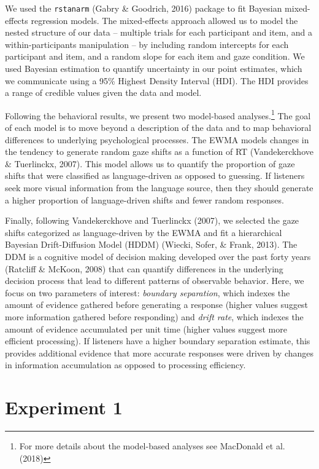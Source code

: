 \documentclass[man,floatsintext]{apa6}
\let\rmarkdownfootnote\footnote%
\def\footnote{\protect\rmarkdownfootnote}
\begin{document}
We used the \texttt{rstanarm} (Gabry \& Goodrich, 2016) package to fit
Bayesian mixed-effects regression models. The mixed-effects approach
allowed us to model the nested structure of our data -- multiple trials
for each participant and item, and a within-participants manipulation --
by including random intercepts for each participant and item, and a
random slope for each item and gaze condition. We used Bayesian
estimation to quantify uncertainty in our point estimates, which we
communicate using a 95\% Highest Density Interval (HDI). The HDI
provides a range of credible values given the data and model.

Following the behavioral results, we present two model-based
analyses.\footnote{For more details about the model-based analyses see
  MacDonald et al. (2018)} The goal of each model is to move beyond a
description of the data and to map behavioral differences to underlying
psychological processes. The EWMA models changes in the tendency to
generate random gaze shifts as a function of RT (Vandekerckhove \&
Tuerlinckx, 2007). This model allows us to quantify the proportion of
gaze shifts that were classified as language-driven as opposed to
guessing. If listeners seek more visual information from the language
source, then they should generate a higher proportion of language-driven
shifts and fewer random responses.

Finally, following Vandekerckhove and Tuerlinckx (2007), we selected the
gaze shifts categorized as language-driven by the EWMA and fit a
hierarchical Bayesian Drift-Diffusion Model (HDDM) (Wiecki, Sofer, \&
Frank, 2013). The DDM is a cognitive model of decision making developed
over the past forty years (Ratcliff \& McKoon, 2008) that can quantify
differences in the underlying decision process that lead to different
patterns of observable behavior. Here, we focus on two parameters of
interest: \emph{boundary separation}, which indexes the amount of
evidence gathered before generating a response (higher values suggest
more information gathered before responding) and \emph{drift rate},
which indexes the amount of evidence accumulated per unit time (higher
values suggest more efficient processing). If listeners have a higher
boundary separation estimate, this provides additional evidence that
more accurate responses were driven by changes in information
accumulation as opposed to processing efficiency.

\hypertarget{experiment-1}{%
\section{Experiment 1}\label{experiment-1}}
\end{document}
